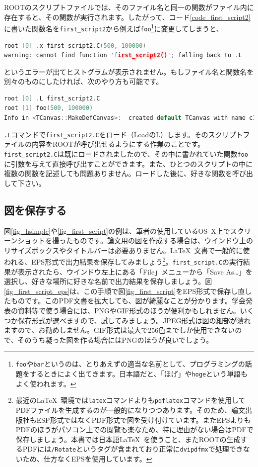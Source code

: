 ROOTのスクリプトファイルでは、そのファイル名と同一の関数がファイル内に存在すると、その関数が実行されます。したがって、コード\ref{code_first_script2}に書いた関数名を\texttt{first\_script2}から例えば\texttt{foo}\footnote{\texttt{foo}や\texttt{bar}というのは、とりあえずの適当な名前として、プログラミングの話題をするときによく出てきます。日本語だと、「ほげ」や\texttt{hoge}という単語もよく使われます。}に変更してしまうと、
\begin{lstlisting}[language=c++]
root [0] .x first_script2.C(500, 100000)
warning: cannot find function 'first_script2()'; falling back to .L
\end{lstlisting}
というエラーが出てヒストグラムが表示されません。もしファイル名と関数名を別々のものにしたければ、次のやり方も可能です。
\begin{lstlisting}[language=c++]
root [0] .L first_script2.C
root [1] foo(500, 100000)
Info in <TCanvas::MakeDefCanvas>:  created default TCanvas with name c1
\end{lstlisting}
\texttt{.L}コマンドで\texttt{first\_script2.C}をロード（LoadのL）します。そのスクリプトファイルの内容をROOTが呼び出せるようにする作業のことです。\texttt{first\_script2.C}は既にロードされましたので、その中に書かれていた関数\texttt{foo}に引数を与えて直接呼び出すことができます。また、ひとつのスクリプトの中に複数の関数を記述しても問題ありません。ロードした後に、好きな関数を呼び出して下さい。
\subsection{図を保存する}

図\ref{fig_hsimple}や\ref{fig_first_script}の例は、筆者の使用しているOS~X上でスクリーンショットを撮ったものです。論文用の図を作成する場合は、ウインドウ上のリサイズボックスやタイトルバーは必要ありません。\LaTeX\ 文書で一般的に使われる、EPS形式で出力結果を保存してみましょう\footnote{最近の\LaTeX\ 環境では\texttt{latex}コマンドよりも\texttt{pdflatex}コマンドを使用してPDFファイルを生成するのが一般的になりつつあります。そのため、論文出版社もESP形式ではなくPDF形式で図を受け付けています。またEPSよりもPDFのほうがパソコン上での閲覧も楽なため、特に理由がない場合はPDFで保存しましょう。本書では日本語\LaTeX\ を使うこと、またROOTの生成するPDFには\texttt{/Rotate}というタグが含まれており正常に\texttt{dvipdfmx}で処理できないため、仕方なくEPSを使用しています。}。\texttt{first\_script.C}の実行結果が表示されたら、ウインドウ左上にある「File」メニューから「Save As\ldots」を選択し、好きな場所に好きな名前で出力結果を保存しましょう。図\ref{fig_first_script_eps}は、この手順で図\ref{fig_first_script}をEPS形式で保存し直したものです。このPDF文書を拡大しても、図が綺麗なことが分かります。学会発表の資料等で使う場合には、PNGやGIF形式のほうが便利かもしれません。いくつか保存形式が選べますので、試してみましょう。JPEG形式は図の細部が潰れますので、お勧めしません。GIF形式は最大で256色までしか使用できないので、そのうち凝った図を作る場合にはPNGのほうが良いでしょう。

